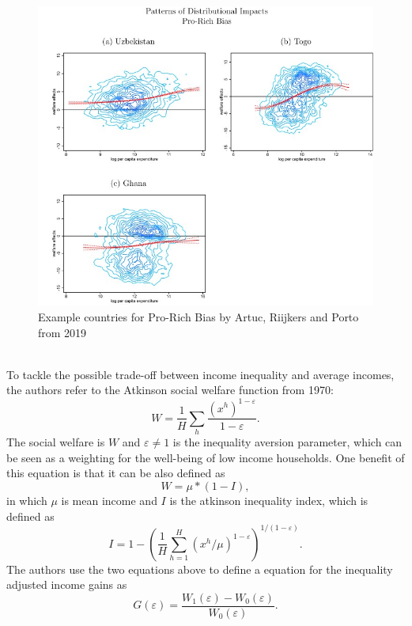 \begin{figure}[h!]
    \centering
    \includegraphics*[scale=0.5]{graphics/prorich.jpg}
    \caption{Example countries for Pro-Rich Bias by Artuc, Riijkers and Porto from 2019}
    \label{fig:prorich}
\end{figure}\\
To tackle the possible trade-off between income inequality and average incomes, the authors refer to the Atkinson social 
welfare function from 1970:
\begin{equation} \label{eq:equation13}
    W =\frac{1}{H}\sum_{h}\frac{(x^h)^{1-\varepsilon}}{1-\varepsilon}. 
\end{equation}
The social welfare is \(W\) and \(\varepsilon \neq 1\) is the inequality aversion parameter, which can be seen as a weighting for
the well-being of low income households. One benefit of this equation is that it can be also defined as 
\begin{equation} \label{eq:equation14}
    W = \mu * (1-I),
\end{equation}
in which \(\mu\) is mean income and \(I\) is the atkinson inequality index, which is defined as 
\begin{equation} \label{eq:equation15}
    I = 1-(\frac{1}{H}\sum_{h=1}^H (x^h/\mu)^{1-\varepsilon})^{1/(1-\varepsilon)}.
\end{equation}
The authors use the two equations above to define a equation for the inequality adjusted income gains as 
\begin{equation} \label{eq:equation16}
    G(\varepsilon)= \frac{W_{1}(\varepsilon)-W_{0}(\varepsilon)}{W_{0}(\varepsilon)}.
\end{equation}
